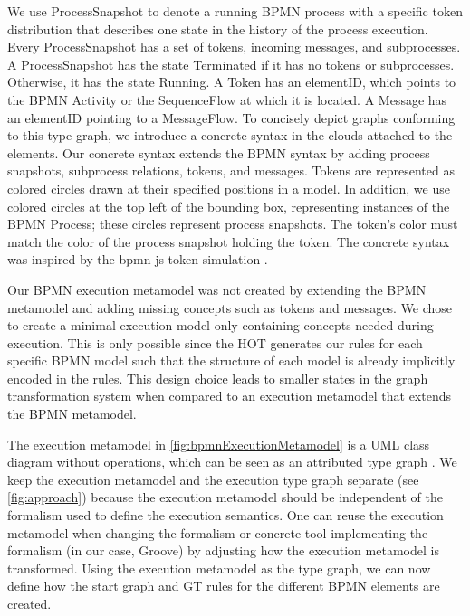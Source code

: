 \documentclass{lmcs} %
\begin{document}
We use \textsf{ProcessSnapshot} to denote a running BPMN process with a specific token distribution that describes one state in the history of the process execution.
Every \textsf{ProcessSnapshot} has a set of \textsf{tokens}, incoming \textsf{messages}, and \textsf{subprocesses}.
A \textsf{ProcessSnapshot} has the state \textsf{Terminated} if it has no \textsf{tokens} or \textsf{subprocesses}.
Otherwise, it has the state \textsf{Running}.
A \textsf{Token} has an \textsf{elementID}, which points to the BPMN \textsf{Activity} or the \textsf{SequenceFlow} at which it is located.
A \textsf{Message} has an \textsf{elementID} pointing to a \textsf{MessageFlow}.
To concisely depict graphs conforming to this type graph, we introduce a concrete syntax in the clouds attached to the elements.
Our concrete syntax extends the BPMN syntax by adding process snapshots, subprocess relations, tokens, and messages.
Tokens are represented as colored circles drawn at their specified positions in a model.
In addition, we use colored circles at the top left of the bounding box, representing instances of the BPMN \textsf{Process}; these circles represent process snapshots.
The token's color must match the color of the process snapshot holding the token.
The concrete syntax was inspired by the bpmn-js-token-simulation \cite{camundaservicesgmbhBpmnjsTokenSimulation2023}.

Our BPMN execution metamodel was not created by extending the BPMN metamodel and adding missing concepts such as tokens and messages.
We chose to create a minimal execution model only containing concepts needed during execution.
This is only possible since the HOT generates our rules for each specific BPMN model such that the structure of each model is already implicitly encoded in the rules.
This design choice leads to smaller states in the graph transformation system when compared to an execution metamodel that extends the BPMN metamodel.

The execution metamodel in \autoref{fig:bpmnExecutionMetamodel} is a UML class diagram without operations, which can be seen as an attributed type graph \cite{heckelGraphTransformationSoftware2020}.
We keep the execution metamodel and the execution type graph separate (see \autoref{fig:approach}) because the execution metamodel should be independent of the formalism used to define the execution semantics.
One can reuse the execution metamodel when changing the formalism or concrete tool implementing the formalism (in our case, Groove) by adjusting how the execution metamodel is transformed.
Using the execution metamodel as the type graph, we can now define how the start graph and GT rules for the different BPMN elements are created.
\end{document}
